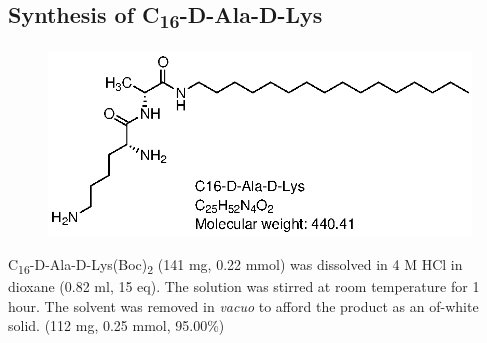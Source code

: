 \newpage
\subsection*{Synthesis of C\textsubscript{16}-D-Ala-D-Lys}
\begin{figure}[ht!]
\centering
\includegraphics{Figures/C16-D-Ala-D-Lys.eps}
\end{figure}
C\textsubscript{16}-D-Ala-D-Lys(Boc)\textsubscript{2} (141 mg, 0.22 mmol) was dissolved in 4 M HCl in dioxane (0.82 ml, 15 eq). The solution was stirred at room temperature for 1 hour. The solvent was removed in \textit{vacuo} to afford the product as an of-white solid. (112 mg, 0.25 mmol, 95.00\%) 

